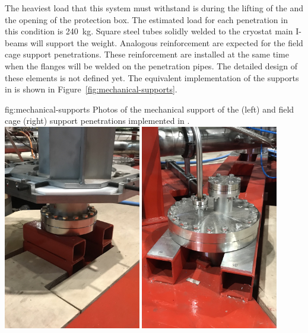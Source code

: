 The heaviest load that this system must withstand is during the lifting of the  and the opening of the protection box.
The estimated load for each penetration in this condition is 240~kg.
Square steel tubes solidly welded to the cryostat main I-beams will support the weight.
Analogous reinforcement are expected for the field cage support penetrations.
These reinforcement are installed at the same time when the flanges will be welded on the penetration pipes.
The detailed design of these elements is not defined yet.
The equivalent implementation of the supports in  is shown in Figure~\ref{fig:mechanical-supports}.
\begin{dunefigure}{fig:mechanical-supports}
{Photos of the mechanical support of the  (left) and field cage (right) support penetrations implemented in .}
\includegraphics[width=0.45\textwidth]{graphics/crpSupport.jpg}
\includegraphics[width=0.45\textwidth]{graphics/fieldCageSupport.jpg}
\end{dunefigure}

